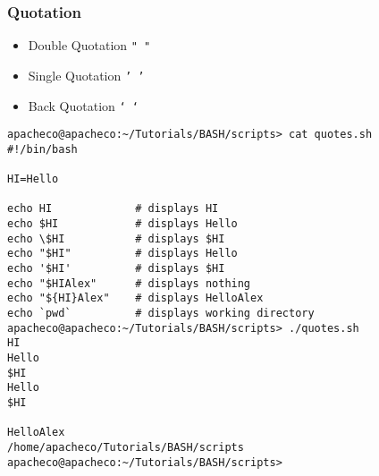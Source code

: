 \documentclass[slidestop,mathserif,compress,xcolor=svgnames]{beamer}
\begin{document}
\begin{frame}
  \frametitle{\small Quotation}
  \begin{itemize}
    \item Double Quotation \texttt{" "}
    \item Single Quotation \texttt{' '}
    \item Back Quotation \texttt{` `}
  \end{itemize}
  \tiny{
  \begin{verbatim}
apacheco@apacheco:~/Tutorials/BASH/scripts> cat quotes.sh 
#!/bin/bash

HI=Hello

echo HI             # displays HI
echo $HI            # displays Hello
echo \$HI           # displays $HI
echo "$HI"          # displays Hello
echo '$HI'          # displays $HI
echo "$HIAlex"      # displays nothing
echo "${HI}Alex"    # displays HelloAlex
echo `pwd`          # displays working directory
apacheco@apacheco:~/Tutorials/BASH/scripts> ./quotes.sh 
HI
Hello
$HI
Hello
$HI

HelloAlex
/home/apacheco/Tutorials/BASH/scripts
apacheco@apacheco:~/Tutorials/BASH/scripts>
  \end{verbatim}
  }
\end{frame}
\end{document}

